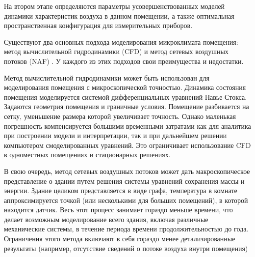 На втором этапе определяются параметры усовершенствованных моделей динамики характеристик воздуха в данном помещении, а также оптимальная пространственная конфигурация для измерительных приборов.


\newpage


Существуют два основных подхода моделирования микроклимата помещения: метод вычислительной гидродинамики (CFD) и метод сетевых воздушных потоков (NAF) \cite{ashrae}. У каждого из этих подходов свои преимущества и недостатки.

Метод вычислительной гидродинамики может быть использован для моделирования помещения с микроскопической точностью. Динамика состояния помещения моделируется системой дифференциальных уравнений Навье-Стокса. Задаются геометрия помещения и граничные условия. Помещение разбивается на сетку, уменьшение размера которой увеличивает точность. Однако маленькая погрешность компенсируется большими временными затратами как для аналитика при построении модели и интерпретации, так и при дальнейшем решении компьютером смоделированных уравнений. Это ограничивает использование CFD в одноместных помещениях и стационарных решениях.

В свою очередь, метод сетевых воздушных потоков может дать макроскопическое представление о здании путем решения системы уравнений сохранения массы и энергии. Здание целиком представляется в виде графа, температура в комнате аппроксимируется точкой (или несколькими для больших помещений), в которой находится датчик. Весь этот процесс занимает гораздо меньше времени, что делает возможным моделирование всего здания, включая различные механические системы, в течение периода времени продолжительностью до года. Ограничения этого метода включают в себя гораздо менее детализированные результаты (например, отсутствие сведений о потоке воздуха внутри помещения)

